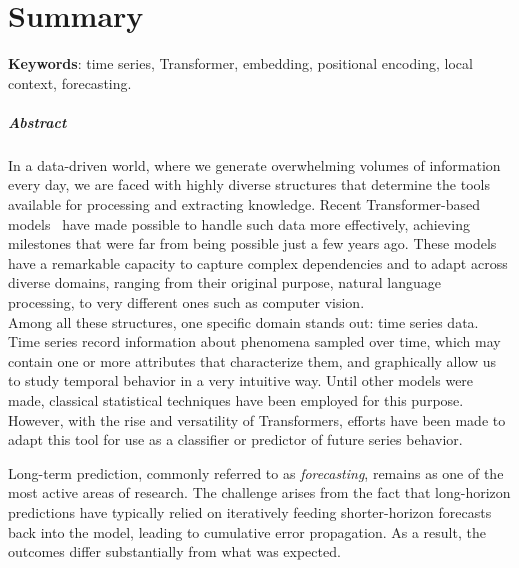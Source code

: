 %

\chapter{Summary}
\textbf{Keywords}: time series, Transformer, embedding, positional encoding, local context, forecasting.

\vspace{1em}
\paragraph{Abstract}

In a data-driven world, where we generate overwhelming volumes of information every day, we are faced with highly diverse structures that determine the tools available for processing and extracting knowledge. Recent Transformer-based models~\cite{vaswani2023attentionneed} have made possible to handle such data more effectively, achieving milestones that were far from being possible just a few years ago. These models have a remarkable capacity to capture complex dependencies and to adapt across diverse domains, ranging from their original purpose, natural language processing, to very different ones such as computer vision.\\
Among all these structures, one specific domain stands out: time series data. Time series record information about phenomena sampled over time, which may contain one or more attributes that characterize them, and graphically allow us to study temporal behavior in a very intuitive way. Until other models were made, classical statistical techniques have been employed for this purpose. However, with the rise and versatility of Transformers, efforts have been made to adapt this tool for use as a classifier or predictor of future series behavior.\vspace{0.35em}

Long-term prediction, commonly referred to as \textit{forecasting}, remains as one of the most active areas of research. The challenge arises from the fact that long-horizon predictions have typically relied on iteratively feeding shorter-horizon forecasts back into the model, leading to cumulative error propagation. As a result, the outcomes differ substantially from what was expected.


